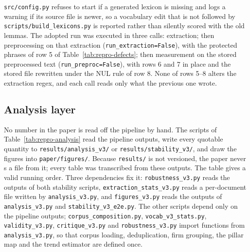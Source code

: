 \nolinkurl{src/config.py} refuses to start if a generated lexicon is missing
and logs a warning if its source file is newer, so a vocabulary edit that is
not followed by \nolinkurl{scripts/build_lexicons.py} is reported rather than
silently scored with the old lemmas. The adopted run was executed in three
calls: extraction; then preprocessing on that extraction
(\texttt{run\_extraction=False}), with the protected phrases of row 5 of
Table~\ref{tab:repro-defects}; then measurement on the stored preprocessed
text (\texttt{run\_preproc=False}), with rows 6 and 7 in place and the stored
file rewritten under the NUL rule of row 8. None of rows 5--8 alters the
extraction regex, and each call reads only what the previous one wrote.

\subsection{Analysis layer}
\label{sec:repro-analysis}

No number in the paper is read off the pipeline by hand. The scripts of
Table~\ref{tab:repro-analysis} read the pipeline outputs, write every quotable
quantity to \nolinkurl{results/analysis_v3/} or \nolinkurl{results/stability_v3/},
and draw the figures into \nolinkurl{paper/figures/}. Because
\nolinkurl{results/} is not versioned, the paper never \verb||s a file
from it; every table was transcribed from these outputs. The table gives a
valid running order. Three dependencies fix it:
\nolinkurl{robustness_v3.py} reads the outputs of both stability scripts,
\nolinkurl{extraction_stats_v3.py} reads a per-document file written by
\nolinkurl{analysis_v3.py}, and \nolinkurl{figures_v3.py} reads the outputs of
\nolinkurl{analysis_v3.py} and \nolinkurl{stability_v3_e2e.py}. The other
scripts depend only on the pipeline outputs;
\nolinkurl{corpus_composition.py}, \nolinkurl{vocab_v3_stats.py},
\nolinkurl{validity_v3.py}, \nolinkurl{critique_v3.py} and
\nolinkurl{robustness_v3.py} import functions from \nolinkurl{analysis_v3.py},
so that corpus loading, deduplication, firm grouping, the pillar map and the
trend estimator are defined once.

